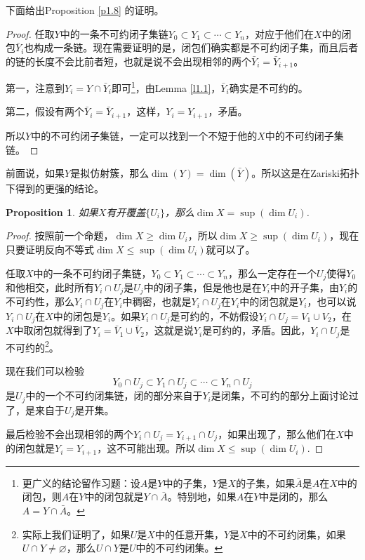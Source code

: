 \documentclass[9pt]{extarticle}
\theoremstyle{plain}%
\newtheorem{pro}[defi]{Proposition}%
\begin{document}
下面给出Proposition \ref{p1.8} 的证明。
\begin{proof}
任取$Y$中的一条不可约闭子集链$Y_0\subset Y_1\subset \cdots \subset Y_n$，对应于他们在$X$中的闭包$\bar{Y}_i$也构成一条链。现在需要证明的是，闭包们确实都是不可约闭子集，而且后者的链的长度不会比前者短，也就是说不会出现相邻的两个$\bar{Y}_i=\bar{Y}_{i+1}$。

第一，注意到$Y_i=Y\cap \bar{Y}_i$即可\footnote{更广义的结论留作习题：设$A$是$Y$中的子集，$Y$是$X$的子集，如果$\bar{A}$是$A$在$X$中的闭包，则$A$在$Y$中的闭包就是$Y\cap \bar{A}$。特别地，如果$A$在$Y$中是闭的，那么$A=Y\cap \bar{A}$。}，由Lemma \ref{l1.1}，$\bar{Y}_i$确实是不可约的。

第二，假设有两个$\bar{Y}_i=\bar{Y}_{i+1}$，这样，$Y_i=Y_{i+1}$，矛盾。

所以$Y$中的不可约闭子集链，一定可以找到一个不短于他的$X$中的不可约闭子集链。
\end{proof}

前面说，如果$Y$是拟仿射簇，那么$\dim(Y)=\dim(\bar{Y})$。所以这是在Zariski拓扑下得到的更强的结论。

\begin{pro}
如果$X$有开覆盖$\{U_i\}$，那么$\dim X=\sup(\dim U_i)$.
\label{p1.9}
\end{pro}
\begin{proof}
按照前一个命题，$\dim X\geq \dim U_i$，所以$\dim X\geq \sup(\dim U_i)$，现在只要证明反向不等式$\dim X\leq \sup(\dim U_i)$就可以了。

任取$X$中的一条不可约闭子集链，$Y_0\subset Y_1\subset \cdots \subset Y_n$，那么一定存在一个$U_j$使得$Y_0$和他相交，此时所有$Y_i\cap U_j$是$U_j$中的闭子集，但是他也是在$Y_i$中的开子集，由$Y_i$的不可约性，那么$Y_i\cap U_j$在$Y_i$中稠密，也就是$Y_i\cap U_j$在$Y_i$中的闭包就是$Y_i$，也可以说$Y_i\cap U_j$在$X$中的闭包是$Y_i$。如果$Y_i\cap U_j$是可约的，不妨假设$Y_i\cap U_j=V_1\cup V_2$，在$X$中取闭包就得到了$Y_i=\bar{V}_1\cup \bar{V}_2$，这就是说$Y_i$是可约的，矛盾。因此，$Y_i\cap U_j$是不可约的\footnote{实际上我们证明了，如果$U$是$X$中的任意开集，$Y$是$X$中的不可约闭集，如果$U\cap Y\neq \varnothing$，那么$U\cap Y$是$U$中的不可约闭集。}。

现在我们可以检验
\[
	Y_0\cap U_j\subset Y_1\cap U_j\subset \cdots \subset Y_n\cap U_j
\]
是$U_j$中的一个不可约闭集链，闭的部分来自于$Y_i$是闭集，不可约的部分上面讨论过了，是来自于$U_j$是开集。

最后检验不会出现相邻的两个$Y_i\cap U_j=Y_{i+1}\cap U_j$，如果出现了，那么他们在$X$中的闭包就是$Y_i=Y_{i+1}$，这不可能出现。所以$\dim X\leq \sup(\dim U_i)$.
\end{proof}
\end{document}
